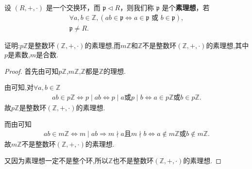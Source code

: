 \documentclass[../../main.tex]{subfiles}
\begin{document}
\begin{definition}[素理想]
设 $(R, +, \cdot)$ 是一个交换环，而 $\mathfrak{p} \lhd R$，则我们称 $\mathfrak{p}$ 是个\textbf{素理想}，若
\begin{gather*}
\forall a, b \in \mathbb{Z}, (ab \in \mathfrak{p} \iff a \in \mathfrak{p} \text{ 或 } b \in \mathfrak{p}),
\\
\mathfrak{p} \neq R.
\end{gather*}
\end{definition}

\begin{proposition}\label{proposition:整数环中的素理想}
证明:$p\mathbb{Z}$是整数环$(\mathbb{Z},+,\cdot)$的素理想,而$m\mathbb{Z}$和$\mathbb{Z}$不是整数环$(\mathbb{Z},+,\cdot)$的素理想,其中$p$是素数,$m$是合数.
\end{proposition}
\begin{proof}
首先由可知$p\mathbb{Z}$,$m\mathbb{Z}$,$\mathbb{Z}$都是$\mathbb{Z}$的理想.

由可知,对$\forall a,b\in \mathbb{Z}$
\begin{align*}
ab\in p\mathbb{Z} \Leftrightarrow p\mid ab\Leftrightarrow p\mid a\text{或}p\mid b\Leftrightarrow a\in p\mathbb{Z} \text{或}b\in p\mathbb{Z} .
\end{align*}
故$p\mathbb{Z}$是整数环$(\mathbb{Z},+,\cdot)$的素理想.

而由可知
\begin{align*}
ab\in m\mathbb{Z} \Leftrightarrow m\mid ab\Rightarrow m\nmid a\text{且}m\nmid b\Leftrightarrow a\notin m\mathbb{Z} \text{或}b\notin m\mathbb{Z} .
\end{align*}
故$m\mathbb{Z}$不是整数环$(\mathbb{Z},+,\cdot)$的素理想.

又因为素理想一定不是整个环,所以$\mathbb{Z}$也不是整数环$(\mathbb{Z},+,\cdot)$的素理想.

\end{proof}
\end{document}
